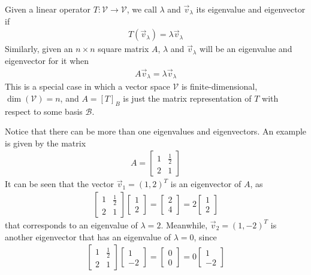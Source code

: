 \begin{defn}
\label{defn:eigen}
Given a linear operator $T: \mathcal{V} \to \mathcal{V}$, we call $\lambda$ and $\vec{v}_\lambda$ its eigenvalue and eigenvector if
\begin{align*}
T(\vec{v}_\lambda) = \lambda\vec{v}_\lambda
\end{align*}
Similarly, given an $n \times n$ square matrix $A$, $\lambda$ and $\vec{v}_\lambda$ will be an eigenvalue and eigenvector for it when
\begin{align*}
A\vec{v}_\lambda = \lambda\vec{v}_\lambda
\end{align*}
This is a special case in which a vector space $\mathcal{V}$ is finite-dimensional, $\dim(\mathcal{V}) = n$, and $A = [T]_B$ is just the matrix representation of $T$ with respect to some basis $\mathcal{B}$.
\end{defn}
Notice that there can be more than one eigenvalues and eigenvectors.
An example is given by the matrix
\begin{align*}
A =
\begin{bmatrix}
1 & \frac{1}{2} \\
2 & 1
\end{bmatrix}
\end{align*}
It can be seen that the vector $\vec{v}_1 = (1,2)^T$ is an eigenvector of $A$, as
\begin{align*}
\begin{bmatrix}
1 & \frac{1}{2} \\
2 & 1
\end{bmatrix}
\begin{bmatrix}
1 \\
2
\end{bmatrix}
=
\begin{bmatrix}
2 \\
4
\end{bmatrix}
=
2
\begin{bmatrix}
1 \\
2 
\end{bmatrix}
\end{align*}
that corresponds to an eigenvalue of $\lambda = 2$. Meanwhile, $\vec{v}_2 = (1,-2)^T$ is another eigenvector that has an eigenvalue of $\lambda = 0$, since
\begin{align*}
\begin{bmatrix}
1 & \frac{1}{2} \\
2 & 1
\end{bmatrix}
\begin{bmatrix}
1 \\
-2
\end{bmatrix}
=
\begin{bmatrix}
0 \\
0
\end{bmatrix}
=
0
\begin{bmatrix}
1 \\
-2
\end{bmatrix}
\end{align*}
